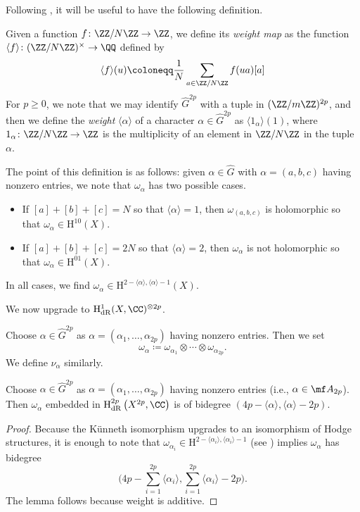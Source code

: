 \documentclass[../thesis.tex]{subfiles}
\begin{document}
Following \cite[Proposition~7.6]{deligne-hodge}, it will be useful to have the following definition.
\begin{definition}[weight]
	Given a function $f\colon\ZZ/N\ZZ\to\ZZ$, we define its \textit{weight map} as the function $\langle f\rangle\colon(\ZZ/N\ZZ)^\times\to\QQ$ defined by
	\[\langle f\rangle(u)\coloneqq\frac1N\sum_{a\in\ZZ/N\ZZ}f(ua)[a]\]
	For $p\ge0$, we note that we may identify $\widehat G^{2p}$ with a tuple in $(\ZZ/m\ZZ)^{2p}$, and then we define the \textit{weight} $\langle\alpha\rangle$ of a character $\alpha\in\widehat G^{2p}$ as $\langle1_\alpha\rangle(1)$, where $1_\alpha\colon\ZZ/N\ZZ\to\ZZ$ is the multiplicity of an element in $\ZZ/N\ZZ$ in the tuple $\alpha$. 
\end{definition}
\begin{remark} \label{rem:deg-by-weight-curve}
	The point of this definition is as follows: given $\alpha\in\widehat G$ with $\alpha=(a,b,c)$ having nonzero entries, we note that $\omega_{\alpha}$ has two possible cases.
	\begin{itemize}
		\item If $[a]+[b]+[c]=N$ so that $\langle\alpha\rangle=1$, then $\omega_{(a,b,c)}$ is holomorphic so that $\omega_{\alpha}\in\mathrm H^{10}(X)$.
		\item If $[a]+[b]+[c]=2N$ so that $\langle\alpha\rangle=2$, then $\omega_{\alpha}$ is not holomorphic so that $\omega_{\alpha}\in\mathrm H^{01}(X)$.
	\end{itemize}
	In all cases, we find $\omega_{\alpha}\in\mathrm H^{2-\langle\alpha\rangle,\langle\alpha\rangle-1}(X)$.
\end{remark}
We now upgrade  to $\mathrm H^1_{\mathrm{dR}}(X,\CC)^{\otimes2p}$.
\begin{notation}
	Choose $\alpha\in\widehat G^{2p}$ as $\alpha=(\alpha_1,\ldots,\alpha_{2p})$ having nonzero entries. Then we set
	\[\omega_{\alpha}\coloneqq\omega_{\alpha_1}\otimes\cdots\otimes\omega_{\alpha_{2p}}.\]
	We define $\nu_\alpha$ similarly.
\end{notation}
\begin{lemma} \label{lem:deg-by-weight-curve-power}
	Choose $\alpha\in\widehat G^{2p}$ as $\alpha=(\alpha_1,\ldots,\alpha_{2p})$ having nonzero entries (i.e., $\alpha\in\mf A_{2p}$). Then $\omega_\alpha$ embedded in $\mathrm H^{2p}_{\mathrm{dR}}\left(X^{2p},\CC\right)$ is of bidegree $(4p-\langle\alpha\rangle,\langle\alpha\rangle-2p)$.
\end{lemma}
\begin{proof}
	Because the K\"unneth isomorphism upgrades to an isomorphism of Hodge structures, it is enough to note that $\omega_{\alpha_i}\in\mathrm H^{2-\langle\alpha_i\rangle,\langle\alpha_i\rangle-1}$ (see ) implies $\omega_\alpha$ has bidegree
	\[\Bigg(4p-\sum_{i=1}^{2p}\langle\alpha_i\rangle,\sum_{i=1}^{2p}\langle\alpha_i\rangle-2p\Bigg).\]
	The lemma follows because weight is additive.
\end{proof}
\end{document}
